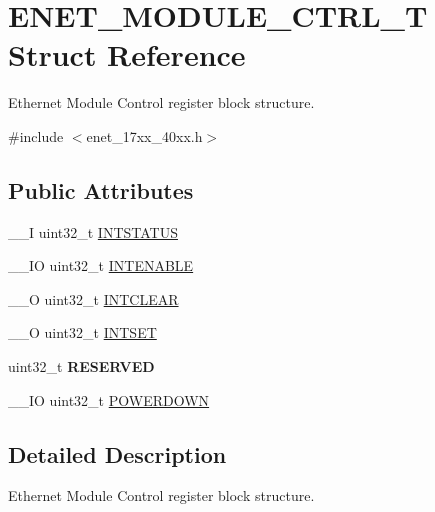 \hypertarget{struct_e_n_e_t___m_o_d_u_l_e___c_t_r_l___t}{\section{E\+N\+E\+T\+\_\+\+M\+O\+D\+U\+L\+E\+\_\+\+C\+T\+R\+L\+\_\+\+T Struct Reference}
\label{struct_e_n_e_t___m_o_d_u_l_e___c_t_r_l___t}
}


Ethernet Module Control register block structure.  




{\ttfamily \#include $<$enet\+\_\+17xx\+\_\+40xx.\+h$>$}

\subsection*{Public Attributes}
\begin{DoxyCompactItemize}
\item 
\+\_\+\+\_\+\+I uint32\+\_\+t \hyperlink{struct_e_n_e_t___m_o_d_u_l_e___c_t_r_l___t_a7dac73c2fd05c5247f006717dbe6c9fa}{I\+N\+T\+S\+T\+A\+T\+U\+S}
\item 
\+\_\+\+\_\+\+I\+O uint32\+\_\+t \hyperlink{struct_e_n_e_t___m_o_d_u_l_e___c_t_r_l___t_a4d21be82461cf028b89fe0e314718352}{I\+N\+T\+E\+N\+A\+B\+L\+E}
\item 
\+\_\+\+\_\+\+O uint32\+\_\+t \hyperlink{struct_e_n_e_t___m_o_d_u_l_e___c_t_r_l___t_a67c87b65d221dfc156c41c76d80aebdb}{I\+N\+T\+C\+L\+E\+A\+R}
\item 
\+\_\+\+\_\+\+O uint32\+\_\+t \hyperlink{struct_e_n_e_t___m_o_d_u_l_e___c_t_r_l___t_a7898d6a89c630ecd471a7a059ee376d6}{I\+N\+T\+S\+E\+T}
\item 
\hypertarget{struct_e_n_e_t___m_o_d_u_l_e___c_t_r_l___t_a511b82f8a23341a28b95e615d75580ef}{uint32\+\_\+t {\bfseries R\+E\+S\+E\+R\+V\+E\+D}}\label{struct_e_n_e_t___m_o_d_u_l_e___c_t_r_l___t_a511b82f8a23341a28b95e615d75580ef}

\item 
\+\_\+\+\_\+\+I\+O uint32\+\_\+t \hyperlink{struct_e_n_e_t___m_o_d_u_l_e___c_t_r_l___t_a42b5ebd11c8549b2ba2bb072b5b42736}{P\+O\+W\+E\+R\+D\+O\+W\+N}
\end{DoxyCompactItemize}


\subsection{Detailed Description}
Ethernet Module Control register block structure. 

